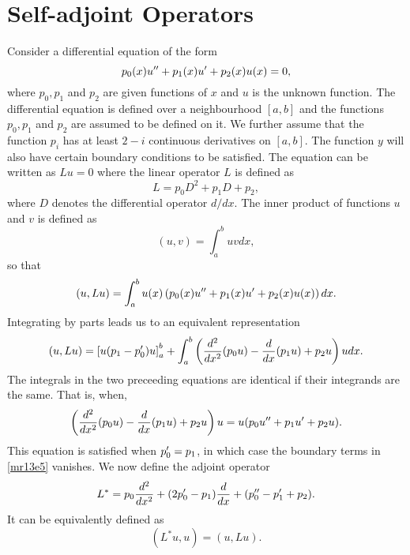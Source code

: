 \section{Self-adjoint Operators}\label{mr13}
Consider a differential equation of the form\cite{arfken1999mathematical}
\begin{equation}\label{mr13e1}
p_0(x)u^{\prime\prime} + p_1(x)u^\prime + p_2(x)u(x) = 0,
\end{equation}
where $p_0, p_1$ and $p_2$ are given functions of $x$ and $u$ is the unknown function. The differential equation is defined over a neighbourhood $[a, b]$ and the functions $p_0, p_1$ and $p_2$ are 
assumed to be defined on it. We further assume that the function $p_i$ has at least $2 - i$ continuous derivatives on $[a, b]$. The function $y$ will also have certain boundary conditions to be
satisfied. The equation can be written as $Lu = 0$ where the linear operator $L$ is defined as
\begin{equation}\label{mr13e2}
L = p_0D^2 + p_1D + p_2,
\end{equation}
where $D$ denotes the differential operator $d/dx$. The inner product of functions $u$ and $v$ is defined as
\begin{equation}\label{mr13e3}
(u, v) = \int_a^b uv dx,
\end{equation}
so that
\begin{equation}\label{mr13e4}
(u, Lu) = \int_a^b u(x)\left(p_0(x)u^{\prime\prime} + p_1(x)u^\prime + p_2(x)u(x)\right)dx.
\end{equation}
Integrating by parts leads us to an equivalent representation
\begin{equation}\label{mr13e5}
(u, Lu) = \left[u(p_1 - p_0^\prime)u\right]_a^b + \int_a^b\left(\frac{d^2}{dx^2}(p_0 u) - \frac{d}{dx}(p_1 u) + p_2 u\right) u dx.
\end{equation}
The integrals in the two preceeding equations are identical if their integrands are the same. That is, when,
\[
\left(\frac{d^2}{dx^2}(p_0 u) - \frac{d}{dx}(p_1 u) + p_2 u\right)u = u(p_0 u^{\prime\prime} + p_1 u^\prime + p_2 u).
\]
This equation is satisfied when $p_0^\prime = p_1$, in which case the boundary terms in \eqref{mr13e5} vanishes. We now define the adjoint
operator
\begin{equation}\label{mr13e6}
L^\ast = p_0\frac{d^2}{dx^2} + (2p_0^\prime - p_1)\frac{d}{dx} + (p_0^{\prime\prime} - p_1^\prime + p_2).
\end{equation}
It can be equivalently defined as
\begin{equation}\label{mr13e7}
(L^\ast u, u) = (u, Lu).
\end{equation}

